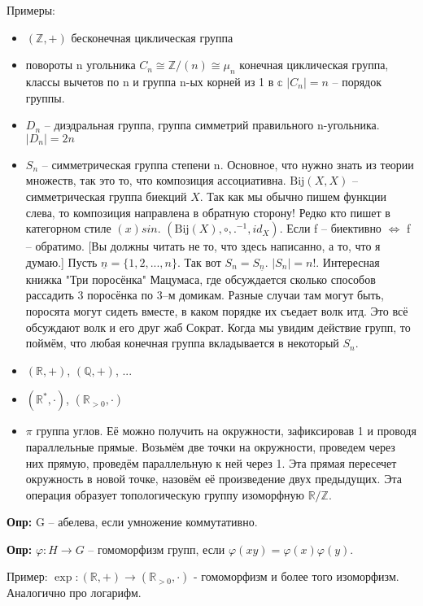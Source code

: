 Примеры:
\begin{itemize}
    \item $(\mathbb{Z},+)$ бесконечная циклическая группа
    \item повороты n угольника $C_n\cong \mathbb{Z}/(n)\cong \mu_n$ конечная
        циклическая группа, классы вычетов по n и группа n-ых корней из 1 в $\mathbb c$
        $|C_n|=n$ – порядок группы.
    \item $D_n$ – диэдральная группа, группа симметрий правильного n-угольника.
        $|D_n|=2n$
    \item $S_n$ – симметрическая группа степени n. Основное, что нужно знать
        из теории множеств, так это то, что композиция ассоциативна. $\text{Bij}(X,X)$ 
        – симметрическая группа биекций $X$. Так как мы обычно пишем функции
        слева, то композиция направлена в обратную сторону! Редко кто пишет в
        категорном стиле $(x)sin$. $(\text{Bij}(X), \circ, .^{-1}, id_X)$. Если
        f – биективно $\iff$ f – обратимо. [Вы должны читать не то, что здесь
        написанно, а то, что я думаю.] Пусть $\underline{n}=\{1,2,...,n\}$. Так
        вот $S_n=S_{\underline{n}}$. $|S_n|=n!$. Интересная книжка "Три
        поросёнка" Мацумаса, где обсуждается сколько способов рассадить 3
        поросёнка по 3–м домикам. Разные случаи там могут быть, поросята могут
        сидеть вместе, в каком порядке их съедает волк итд. Это всё обсуждают
        волк и его друг жаб Сократ. Когда мы увидим действие групп, то поймём,
        что любая конечная группа вкладывается в некоторый $S_n$.
    \item $(\mathbb{R}, +)$, $(\mathbb{Q}, +)$, ...
    \item $(\mathbb{R}^*, \cdot)$, $(\mathbb{R}_{>0},\cdot)$
    \item $\pi$ группа углов. Её можно получить на окружности, зафиксировав 1
        и проводя параллельные прямые. Возьмём две точки на окружности, проведем
        через них прямую, проведём параллельную к ней через 1. Эта прямая
        пересечет окружность в новой точке, назовём её произведение двух
        предыдущих. Эта операция образует топологическую группу изоморфную 
        $\mathbb{R}/\mathbb{Z}$.
\end{itemize}

\textbf{Опр:} G – абелева, если умножение коммутативно.

\textbf{Опр:} $\varphi: H\longrightarrow G$ – гомоморфизм групп, если
$\varphi(xy)=\varphi(x)\varphi(y)$.

Пример: $\exp: (\mathbb{R}, +)\longrightarrow (\mathbb{R}_{>0},\cdot)$ -
гомоморфизм и более того изоморфизм. Аналогично про логарифм.

